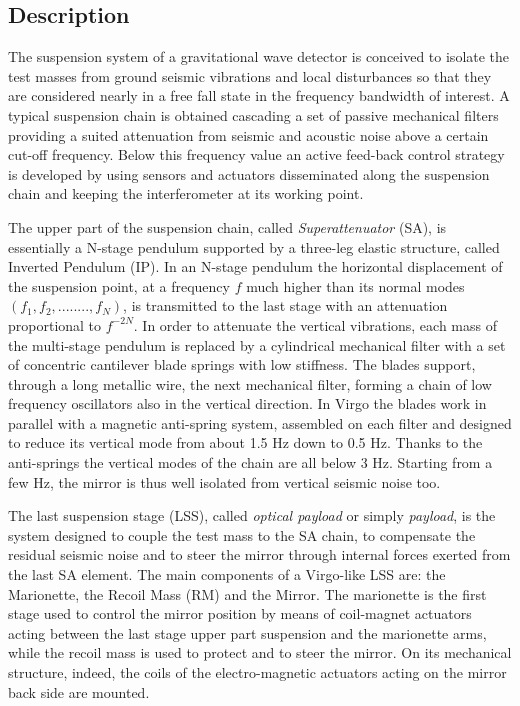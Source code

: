 

%


\FloatBarrier
\subsection{Description}
%
%

The suspension system of a gravitational wave detector is conceived to isolate the test
masses from ground seismic vibrations and local disturbances so that they are considered 
nearly in a free fall state in the frequency bandwidth of interest. 
A typical suspension chain is obtained cascading a set of passive mechanical filters
providing a suited attenuation from seismic and acoustic noise above a certain cut-off
frequency. Below this frequency value an active feed-back control strategy is developed 
by using sensors and actuators disseminated along the suspension chain and keeping the 
interferometer at its working point.
  
The upper part of the suspension chain, called \emph{Superattenuator} (SA), is essentially a 
N-stage pendulum supported by a three-leg elastic structure, called Inverted Pendulum (IP). 
In an N-stage pendulum the horizontal displacement of the suspension point, at a frequency 
$f$ much higher than its normal modes $(f_1, f_2, ........, f_N)$, is transmitted to the 
last stage with an attenuation proportional to $f^{-2N}$.
In order to attenuate the vertical vibrations, each mass of the multi-stage pendulum is 
replaced by a cylindrical mechanical filter with a set of concentric cantilever blade 
springs with low stiffness. The blades support, through a long metallic wire, the next 
mechanical filter, forming a chain of low frequency oscillators also in the vertical direction. 
In Virgo the blades work in parallel with a magnetic anti-spring system, assembled 
on each filter and designed to reduce its vertical mode from about 1.5 Hz down to 0.5 Hz. 
Thanks to the anti-springs the vertical modes of the chain are all below 3 Hz. 
Starting from a few Hz, the mirror is thus well isolated from vertical seismic noise too. 
 
The last suspension stage (LSS), called {\it {optical  payload} } or simply 
{\it {payload}}, is the system designed to couple the test mass to the SA chain, 
to compensate the residual seismic noise and to steer the mirror through internal 
forces exerted from the last SA element. The main components of a Virgo-like LSS are: 
the Marionette, the Recoil Mass (RM) and the Mirror. The marionette is the first 
stage used to control the mirror position by means of coil-magnet actuators acting 
between the last stage upper part suspension and the marionette arms, while the recoil 
mass is used to protect and to steer the mirror. On its mechanical structure, indeed, 
the coils of the electro-magnetic actuators acting on the mirror back side are mounted.


